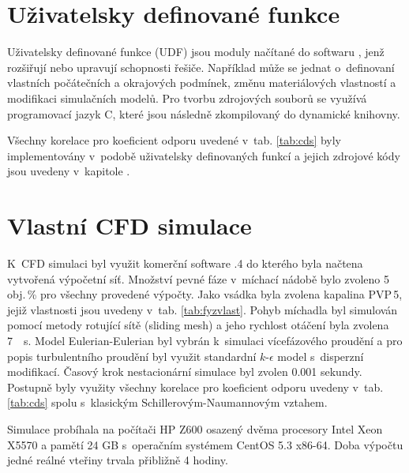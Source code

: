 \vspace{-12mm}

\section{Uživatelsky definované funkce}
Uživatelsky definované funkce (UDF) jsou moduly načítané do softwaru \flu, jenž rozšiřují nebo upravují schopnosti řešiče. Například může se jednat o~definovaní vlastních počátečních a okrajových podmínek, změnu materiálových vlastností a modifikaci simulačních modelů. Pro tvorbu zdrojových souborů se využívá programovací jazyk C, které jsou následně zkompilovaný do dynamické knihovny.

Všechny korelace pro koeficient odporu uvedené v~tab. \ref{tab:cds} byly implementovány v~podobě uživatelsky definovaných funkcí a jejich zdrojové kódy jsou uvedeny v~kapitole .

\section{Vlastní CFD simulace}
K~CFD simulaci byl využit komerční software .4 do kterého byla načtena vytvořená výpočetní síť. Množství pevné fáze v~míchací nádobě bylo zvoleno 5\,obj.\,\% pro všechny provedené výpočty. Jako vsádka byla zvolena kapalina PVP\,5, jejiž vlastnosti jsou uvedeny v~tab. \ref{tab:fyzvlast}. Pohyb míchadla byl simulován pomocí metody rotující sítě (sliding mesh) a jeho rychlost otáčení byla zvolena \SI{7}{\per\second}. Model Eulerian-Eulerian byl vybrán k~simulaci vícefázového proudění a pro popis turbulentního proudění byl využit standardní $k\mbox{-}\epsilon$ model s~disperzní modifikací. Časový krok nestacionární simulace byl zvolen \num{0.001} sekundy. Postupně byly využity všechny korelace pro koeficient odporu uvedeny v~tab. \ref{tab:cds} spolu s~klasickým Schillerovým-Naumannovým vztahem. 

Simulace probíhala na počítači HP Z600 osazený dvěma procesory Intel Xeon X5570 a pamětí 24 GB s~operačním systémem CentOS 5.3 x86-64. Doba výpočtu jedné reálné vteřiny trvala přibližně 4 hodiny.


